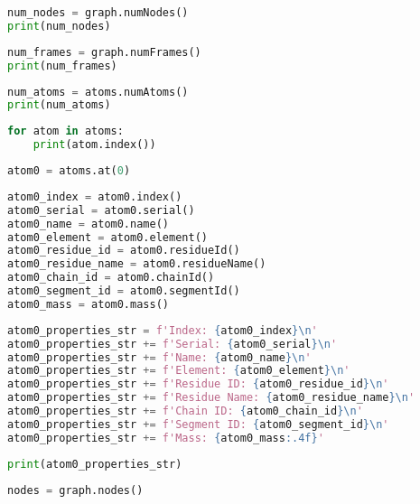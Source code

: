 \documentclass{article}
\begin{document}
    \begin{lstlisting}[language=Python]
num_nodes = graph.numNodes()
print(num_nodes)
    \end{lstlisting}

    \begin{lstlisting}[language=Python]
num_frames = graph.numFrames()
print(num_frames)
    \end{lstlisting}

    \begin{lstlisting}[language=Python]
num_atoms = atoms.numAtoms()
print(num_atoms)
    \end{lstlisting}

    \begin{lstlisting}[language=Python]
for atom in atoms:
    print(atom.index())
    \end{lstlisting}

    \begin{lstlisting}[language=Python]
atom0 = atoms.at(0)
    \end{lstlisting}

    \begin{lstlisting}[language=Python]
atom0_index = atom0.index()
atom0_serial = atom0.serial()
atom0_name = atom0.name()
atom0_element = atom0.element()
atom0_residue_id = atom0.residueId()
atom0_residue_name = atom0.residueName()
atom0_chain_id = atom0.chainId()
atom0_segment_id = atom0.segmentId()
atom0_mass = atom0.mass()
    \end{lstlisting}

    \begin{lstlisting}[language=Python]
atom0_properties_str = f'Index: {atom0_index}\n'
atom0_properties_str += f'Serial: {atom0_serial}\n'
atom0_properties_str += f'Name: {atom0_name}\n'
atom0_properties_str += f'Element: {atom0_element}\n'
atom0_properties_str += f'Residue ID: {atom0_residue_id}\n'
atom0_properties_str += f'Residue Name: {atom0_residue_name}\n'
atom0_properties_str += f'Chain ID: {atom0_chain_id}\n'
atom0_properties_str += f'Segment ID: {atom0_segment_id}\n'
atom0_properties_str += f'Mass: {atom0_mass:.4f}'
    \end{lstlisting}

    \begin{lstlisting}[language=Python]
print(atom0_properties_str)
    \end{lstlisting}

    \begin{lstlisting}[language=Python]
nodes = graph.nodes()
    \end{lstlisting}
\end{document}
